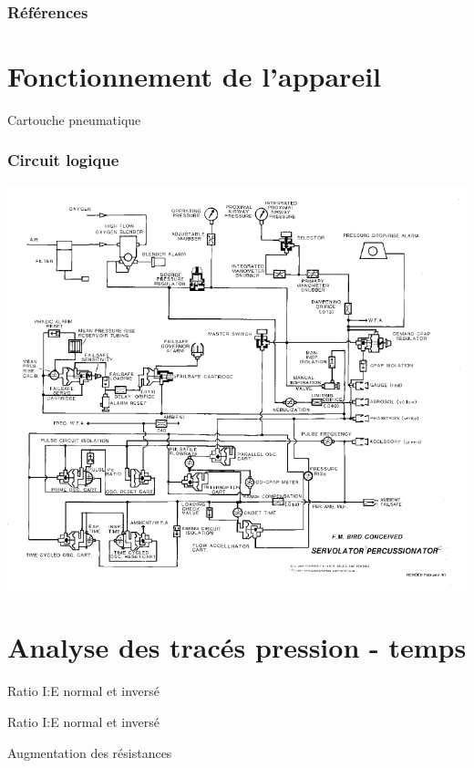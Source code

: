 \documentclass[aspectratio=169]{beamer}
\begin{document}
\begin{frame}
\frametitle{Références}
	\printbibliography{}
\end{frame}

\appendix

\section{Fonctionnement de l'appareil}

\begin{frame}{Cartouche pneumatique}
	
\end{frame}

\begin{frame}[b]
	\frametitle{Circuit logique}
	\centering
	\includegraphics[height=\textheight]{img/circuit-logique.pdf}
\end{frame}

\section{Analyse des tracés pression - temps}

\begin{frame}{Ratio I:E normal et inversé}
	
\end{frame}

\begin{frame}{Ratio I:E normal et inversé}
	
\end{frame}

\begin{frame}{Augmentation des résistances}
	\centering
	
\end{frame}
\end{document}

